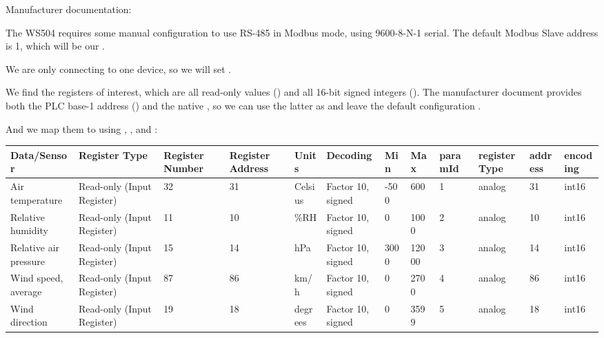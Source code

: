 \documentclass[letterpaper,10pt,english]{sphinxmanual}
\begin{document}
Manufacturer documentation: 

The WS504 requires some manual configuration to use RS-485 in Modbus mode, using 9600-8-N-1 serial.  The default Modbus Slave address is 1, which will be our .

We are only connecting to one device, so we will set .

We find the registers of interest, which are all read-only values () and all 16-bit signed integers ().
The manufacturer document provides both the PLC base-1 address () and the native , so we can use the latter as  and
leave the default configuration .

\label{\detokenize{usage:modbus-register-definitions}}
And we map them to  using , ,  and :


\begin{savenotes}\sphinxattablestart
\centering
{}
\label{\detokenize{usage:id1}}\label{\detokenize{usage:config-file-template}}
\sphinxaftercaption
\begin{tabulary}{\linewidth}[t]{|T|T|T|T|T|T|T|T|T|T|T|T|}
\hline
\sphinxstyletheadfamily 
Data/Sensor
&\sphinxstyletheadfamily 
Register Type
&\sphinxstyletheadfamily 
Register Number
&\sphinxstyletheadfamily 
Register Address
&\sphinxstyletheadfamily 
Units
&\sphinxstyletheadfamily 
Decoding
&\sphinxstyletheadfamily 
Min
&\sphinxstyletheadfamily 
Max
&\sphinxstyletheadfamily 
paramId
&\sphinxstyletheadfamily 
registerType
&\sphinxstyletheadfamily 
address
&\sphinxstyletheadfamily 
encoding
\\
\hline
Air temperature
&
Read-only (Input Register)
&
32
&
31
&
Celsius
&
Factor 10, signed
&
-500
&
600
&
1
&
analog
&
31
&
int16
\\
\hline
Relative humidity
&
Read-only (Input Register)
&
11
&
10
&
\%RH
&
Factor 10, signed
&
0
&
1000
&
2
&
analog
&
10
&
int16
\\
\hline
Relative air pressure
&
Read-only (Input Register)
&
15
&
14
&
hPa
&
Factor 10, signed
&
3000
&
12000
&
3
&
analog
&
14
&
int16
\\
\hline
Wind speed, average
&
Read-only (Input Register)
&
87
&
86
&
km/h
&
Factor 10, signed
&
0
&
2700
&
4
&
analog
&
86
&
int16
\\
\hline
Wind direction
&
Read-only (Input Register)
&
19
&
18
&
degrees
&
Factor 10, signed
&
0
&
3599
&
5
&
analog
&
18
&
int16
\\
\hline
\end{tabulary}
\par
\sphinxattableend\end{savenotes}
\end{document}
